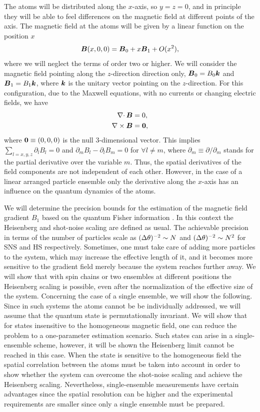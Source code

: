 The atoms will be distributed along the $x$-axis, so $y=z=0$, and in principle they will be able to feel differences on the magnetic field at different points of the axis.
The magnetic field at the atoms will be given by a linear function on the position $x$
\begin{equation}
\boldsymbol{B}(x,0,0)=\boldsymbol{B}_0 +x \boldsymbol{B}_1 + O(x^2),
\end{equation}
where we will neglect the terms of order two or higher.
We will consider the magnetic field pointing along the $z$-direction direction only, $\boldsymbol{B}_0=B_0 \boldsymbol{k}$ and $\boldsymbol{B}_1=B_1\boldsymbol{k}$, where $\boldsymbol{k}$ is the unitary vector pointing on the $z$-direction.
For this configuration, due to the Maxwell equations, with no currents or changing electric fields, we have
\begin{align}
\nabla \cdotp \boldsymbol{B}&=0, \nonumber \\
\nabla \times \boldsymbol{B}&=\boldsymbol{0},
\end{align}
where $\boldsymbol{0}\equiv (0,0,0)$ is the null 3-dimensional vector.
This implies $\sum_{l=x,y,z} \partial_l B_l=0$ and $ \partial_m B_l - \partial_l B_m =0$ for $\forall l\ne m$, where $\partial_m\equiv \partial/\partial_m$ stands for the partial derivative over the variable $m$.
Thus, the spatial derivatives of the field components are not independent of each other.
However, in the case of a linear arranged particle ensemble only the derivative along the $x$-axis has an influence on the quantum dynamics of the atoms.

We will determine the precision bounds for the estimation of the magnetic field gradient $B_1$ based on the quantum Fisher information \cite{Paris2009,Braunstein1994,Holevo1982,Helstrom1976,Petz2002,Petz2008}.
In this context the Heisenberg and shot-noise scaling are defined as usual.
The achievable precision in terms of the number of particles scale as $(\Delta \theta )^{-2}\sim N$ and $(\Delta \theta )^{-2}\sim N^2$ for SNS and HS respectively.
Sometimes, one must take care of adding more particles to the system, which may increase the effective length of it, and it becomes more sensitive to the gradient field merely because the system reaches further away.
We will show that with spin chains or two ensembles at different positions the Heisenberg scaling is possible, even after the normalization of the effective size of the system.
Concerning the case of a single ensemble, we will show the following.
Since in such systems the atoms cannot be be individually addressed, we will assume that the quantum state is permutationally invariant.
We will show that for states insensitive to the homogeneous magnetic field, one can reduce the problem to a one-parameter estimation scenario.
Such states can arise in a single-ensemble scheme, however, it will be shown the Heisenberg limit cannot be reached in this case.
When the state is sensitive to the homogeneous field the spatial correlation between the atoms must be taken into account in order to show whether the system can overcome the shot-noise scaling and achieve the Heisenberg scaling.
Nevertheless, single-ensemble measurements have certain advantages since the spatial resolution can be higher and the experimental requirements are smaller since only a single ensemble must be prepared.

